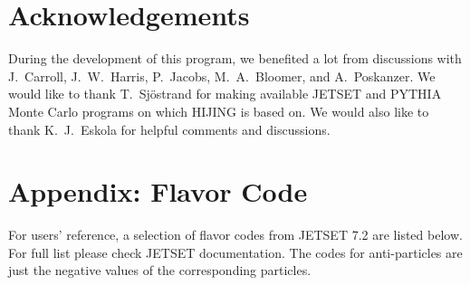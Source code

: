 \section*{Acknowledgements}


        During the development of this program, we benefited a lot
from discussions with J.~Carroll, J.~W.~Harris, P.~Jacobs, 
M.~A.~Bloomer, and A.~Poskanzer.
We would like to thank T.~Sj\"{o}strand for making available
JETSET and PYTHIA Monte Carlo programs on which HIJING is based on.
We would also like to thank K.~J.~Eskola for helpful comments and
discussions.


\section*{Appendix: Flavor Code}

        For users' reference, a selection of flavor codes from JETSET 7.2 
are listed below. For full list please check JETSET documentation. 
The codes for anti-particles are just the negative values of the 
corresponding particles.

